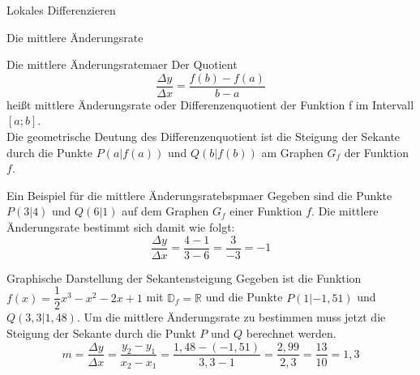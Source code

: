 \begin{section}{Lokales Differenzieren}
\begin{subsection}{Die mittlere Änderungsrate}
\begin{defi}{Die mittlere Änderungsrate}{maer}
Der Quotient $$\dfrac{\Delta y}{\Delta x} = \dfrac{f(b) - f(a)}{b - a}$$ heißt mittlere Änderungsrate oder Differenzenquotient der Funktion f im Intervall $\left[a;b\right]$.\\
Die geometrische Deutung des Differenzenquotient  ist die Steigung der Sekante durch die Punkte $P(a|f(a))$ und $Q(b|f(b))$ am Graphen $G_f$ der Funktion $f$.
\end{defi}
\begin{bsp}{Ein Beispiel für die mittlere Änderungsrate}{bspmaer}
Gegeben sind die Punkte $P(3|4)$ und $Q(6|1)$ auf dem Graphen $G_f$ einer Funktion $f$. Die mittlere Änderungsrate bestimmt sich damit wie folgt: $$ \dfrac{\Delta y}{\Delta x} = \dfrac{4-1}{3-6} = \dfrac{3}{-3} = -1$$
\end{bsp}
\begin{bsp}{Graphische Darstellung der Sekantensteigung}{}
Gegeben ist die Funktion $f(x) =\dfrac{1}{2}x^3-x^2-2x +1$ mit $\mathds{D}_f =\mathds{R}$ und die Punkte $P(1|-1,51)$ und $Q(3,3|1,48)$. Um die mittlere Änderungsrate zu bestimmen muss jetzt die Steigung der Sekante durch die Punkt $P$ und $Q$ berechnet werden.
$$m=\dfrac{\Delta y}{\Delta x} = \dfrac{y_2 -y_1}{x_2 -x_1} = \dfrac{1,48 -(-1,51)}{3,3 -1} = \dfrac{2,99}{2,3} = \dfrac{13}{10} = 1,3 $$
\begin{center}
\end{center}
\end{bsp}
\end{subsection}
\end{section}
